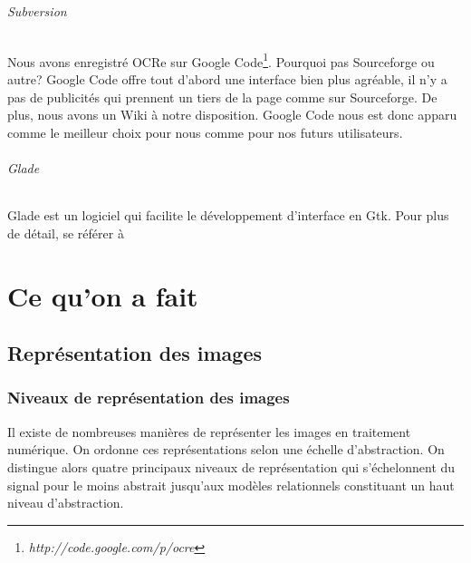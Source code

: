 \documentclass[]{report}
\begin{document}
			\paragraph{Subversion\\} %
			\label{par:subversion}
				Nous avons enregistr\'e OCRe sur Google Code\footnote{\emph{http://code.google.com/p/ocre}}. Pourquoi pas Sourceforge ou autre? Google Code offre tout d'abord une interface bien plus agr\'eable, il n'y a pas de publicit\'es qui prennent un tiers de la page comme sur Sourceforge. De plus, nous avons un Wiki \`a notre disposition. Google Code nous est donc apparu comme le meilleur choix pour nous comme pour nos futurs utilisateurs.
			\paragraph{Glade} %
				Glade est un logiciel qui facilite le d\'eveloppement d'interface en Gtk. Pour plus de d\'etail, se r\'ef\'erer \`a %
			\label{par:glade}





\part{Ce qu'on a fait} %
\label{prt:ce_qu_on_a_fait}


  \chapter{Repr\'esentation des images} %
	\label{cha:repr'esentation_des_images}


    \section{Niveaux de repr\'esentation des images} %
    \label{sec:niveaux_de_repr'esentation_des_images}
  		Il existe de nombreuses manières de représenter les images en traitement numérique. On ordonne ces représentations selon une échelle d'abstraction. On distingue alors quatre principaux niveaux de représentation qui s'échelonnent du signal pour le moins abstrait jusqu'aux modèles relationnels constituant un haut niveau d'abstraction.
\end{document}
